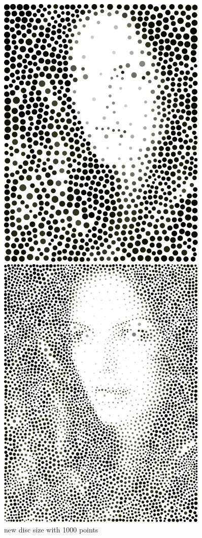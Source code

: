 \documentclass[11pt]{article}
\begin{document}
\begin{figure}[htbp]
\centering
\begin{minipage}[t]{0.48\textwidth}
\centering
\includegraphics[width = 0.9\textwidth]{f-1000-new.png}
\caption{new disc size with 1000 points}
\end{minipage}
\begin{minipage}[t]{0.48\textwidth}
\centering
\includegraphics[width = 0.9\textwidth]{f-4000-new.png}

\end{minipage}
\end{figure}
\end{document}
